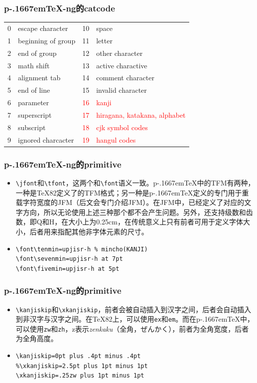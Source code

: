 \documentclass[dvipdfmx]{beamer}
\newcommand{\pTeX}{p\kern-.1667em\TeX}
\newcommand{\ptexng}{\pTeX-ng}
\begin{document}
\begin{frame}[fragile]
\frametitle{\bf \ptexng 的catcode}
\begin{center}
\newcommand{\pcc}[1]{\textcolor{red}{#1}}
\begin{tabular}{clcl}
0&escape character&10&space\\
1&beginning of group&11&letter\\
2&end of group&12&other character\\
3&math shift&13&active charactive\\
4&alignment tab&14&comment character\\
5&end of line&15&invalid character\\
6&parameter&\pcc{16}&\pcc{kanji}\\
7&superscript&\pcc{17}&\pcc{hiragana, katakana, alphabet}\\
8&subscript&\pcc{18}&\pcc{cjk symbol codes}\\
9&ignored charcacter&\pcc{19}&\pcc{hangul codes}\\
\end{tabular}
\end{center}
\end{frame}
%
\begin{frame}[fragile]
\frametitle{\bf \ptexng 的primitive}
\begin{itemize}
\item \verb!\jfont!和\verb!\tfont!，这两个和\verb!\font!语义一致。\pTeX 中的TFM有两种，一种是\TeX82定义了的TFM格式；另一种是\pTeX 定义的专门用于重载字符宽度的JFM（后文会专门介绍JFM）。在JFM中，已经定义了对应的文字方向，所以无论使用上述三种那个都不会产生问题。另外，还支持级数和齿数，即Q和H，在大小上为0.25cm，在传统意义上只有前者可用于定义字体大小，后者用来指配其他非字体元素的尺寸。
\item \begin{verbatim}
\font\tenmin=upjisr-h % mincho(KANJI)
\font\sevenmin=upjisr-h at 7pt
\font\fivemin=upjisr-h at 5pt
\end{verbatim}
\end{itemize}
\end{frame}
%
\begin{frame}[fragile]
\frametitle{\bf \ptexng 的primitive}
\begin{itemize}
\item \verb!\kanjiskip!和\verb!\xkanjiskip!，前者会被自动插入到汉字之间，后者会自动插入到非汉字与汉字之间。在\TeX82上，可以使用\texttt{ex}和\texttt{em}。而在\pTeX 中，可以使用\texttt{zw}和\texttt{zh}，z表示\textit{zenkaku}（全角，ぜんかく），前者为全角宽度，后者为全角高度。
\item \begin{verbatim}
\kanjiskip=0pt plus .4pt minus .4pt
%\xkanjiskip=2.5pt plus 1pt minus 1pt
\xkanjiskip=.25zw plus 1pt minus 1pt
\end{verbatim}
\end{itemize}
\end{frame}
\end{document}

